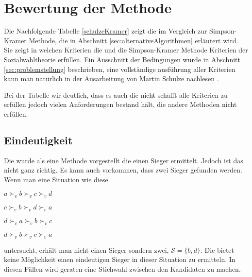 \section{Bewertung der Methode}
\label{sec:Bewertung1}

Die Nachfolgende Tabelle \ref{schulzeKramer} zeigt die \schulze im Vergleich zur Simpson-Kramer Methode, die in Abschnitt \ref{sec:alternativeAlgorithmen} erläutert wird. Sie zeigt in welchen Kriterien die \schulze und die Simpson-Kramer Methode Kriterien der Sozialwahltheorie erfüllen. Ein Ausschnitt der Bedingungen wurde in Abschnitt \ref{sec:problemstellung} beschrieben, eine vollständige ausführung aller Kriterien kann man natürlich in der Ausarbeitung von Martin Schulze nachlesen \citep{Schulze2018}.



Bei der Tabelle wir deutlich, dass es auch die \schulze nicht schafft alle Kriterien zu erfüllen jedoch vielen Anforderungen bestand hält, die andere Methoden nicht erfüllen. 

\subsection{Eindeutigkeit}
\label{sec:eindeutigkeit}
Die \schulze wurde als eine Methode vorgestellt die einen Sieger ermittelt. Jedoch ist das nicht ganz richtig. Es kann auch vorkommen, dass zwei Sieger gefunden werden. Wenn man eine Situation wie diese

\begin{description}
\centering
\item[3 mal] $a \succ_{v} b \succ_{v} c \succ_{v}d$
\item[2 mal] $c \succ_{v} b \succ_{v} d \succ_{v}a$
\item[2 mal] $d \succ_{v} a \succ_{v} b \succ_{v}c$
\item[2 mal] $d \succ_{v} b \succ_{v} c \succ_{v}a$
\end{description} 
untersucht, erhält man nicht einen Sieger sondern zwei, $\mathcal{S}=\{b,d\}$. Die \schulze bietet keine Möglichkeit einen eindeutigen Sieger in dieser Situation zu ermitteln. In diesen Fällen wird geraten eine Stichwahl zwischen den Kandidaten zu machen.
